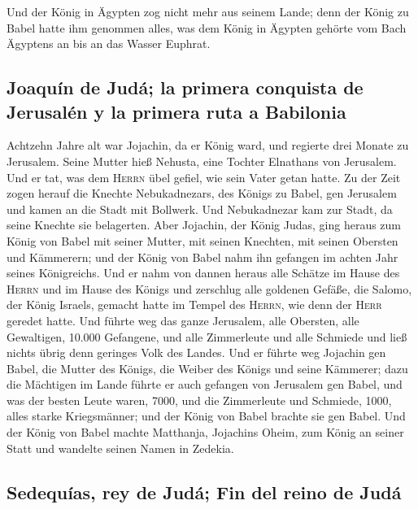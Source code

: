  Und der König in Ägypten zog nicht mehr aus seinem Lande;
denn der König zu Babel hatte ihm genommen alles, was dem König in
Ägypten gehörte vom Bach Ägyptens an bis an das Wasser Euphrat.

\hypertarget{joaquuxedn-de-juduxe1-la-primera-conquista-de-jerusaluxe9n-y-la-primera-ruta-a-babilonia}{%
\subsection{Joaquín de Judá; la primera conquista de Jerusalén y la
primera ruta a
Babilonia}\label{joaquuxedn-de-juduxe1-la-primera-conquista-de-jerusaluxe9n-y-la-primera-ruta-a-babilonia}}

 Achtzehn Jahre alt war Jojachin, da er König ward, und
regierte drei Monate zu Jerusalem. Seine Mutter hieß Nehusta, eine
Tochter Elnathans von Jerusalem.  Und er tat, was dem
\textsc{Herrn} übel gefiel, wie sein Vater getan hatte. 
Zu der Zeit zogen herauf die Knechte Nebukadnezars, des Königs zu Babel,
gen Jerusalem und kamen an die Stadt mit Bollwerk.  Und
Nebukadnezar kam zur Stadt, da seine Knechte sie belagerten.
 Aber Jojachin, der König Judas, ging heraus zum König
von Babel mit seiner Mutter, mit seinen Knechten, mit seinen Obersten
und Kämmerern; und der König von Babel nahm ihn gefangen im achten Jahr
seines Königreichs.  Und er nahm von dannen heraus alle
Schätze im Hause des \textsc{Herrn} und im Hause des Königs und
zerschlug alle goldenen Gefäße, die Salomo, der König Israels, gemacht
hatte im Tempel des \textsc{Herrn}, wie denn der \textsc{Herr} geredet
hatte.  Und führte weg das ganze Jerusalem, alle
Obersten, alle Gewaltigen, 10.000 Gefangene, und alle Zimmerleute und
alle Schmiede und ließ nichts übrig denn geringes Volk des Landes.
 Und er führte weg Jojachin gen Babel, die Mutter des
Königs, die Weiber des Königs und seine Kämmerer; dazu die Mächtigen im
Lande führte er auch gefangen von Jerusalem gen Babel, 
und was der besten Leute waren, 7000, und die Zimmerleute und Schmiede,
1000, alles starke Kriegsmänner; und der König von Babel brachte sie gen
Babel.  Und der König von Babel machte Matthanja,
Jojachins Oheim, zum König an seiner Statt und wandelte seinen Namen in
Zedekia.

\hypertarget{sedequuxedas-rey-de-juduxe1-fin-del-reino-de-juduxe1}{%
\subsection{Sedequías, rey de Judá; Fin del reino de
Judá}\label{sedequuxedas-rey-de-juduxe1-fin-del-reino-de-juduxe1}}

